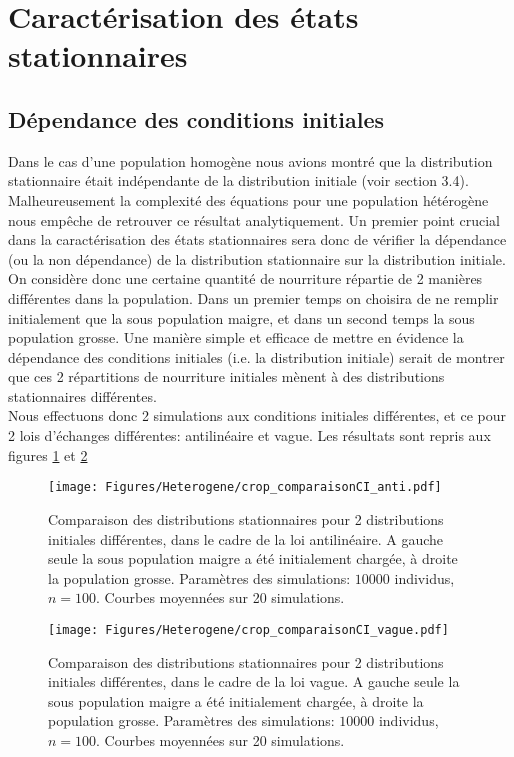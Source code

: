 \pagebreak

\section{Caractérisation des états stationnaires}

\subsection{Dépendance des conditions initiales}
Dans le cas d'une population homogène nous avions montré que la distribution stationnaire était indépendante de la distribution initiale (voir section 3.4). Malheureusement la complexité des équations pour une population hétérogène nous empêche de retrouver ce résultat analytiquement. Un premier point crucial dans la caractérisation des états stationnaires sera donc de vérifier la dépendance (ou la non dépendance) de la distribution stationnaire sur la distribution initiale.\\

On considère donc une certaine quantité de nourriture répartie de 2 manières différentes dans la population. Dans un premier temps on choisira de ne remplir initialement que la sous population maigre, et dans un second temps la sous population grosse. Une manière simple et efficace de mettre en évidence la dépendance des conditions initiales (i.e. la distribution initiale) serait de montrer que ces 2 répartitions de nourriture initiales mènent à des distributions stationnaires différentes. \\

Nous effectuons donc 2 simulations aux conditions initiales différentes, et ce pour 2 lois d'échanges différentes: antilinéaire et vague. Les résultats sont repris aux figures \ref{comparaison_CI_anti} et \ref{comparaison_CI_vague}\\

\begin{figure}[h!]
\centering
\texttt{[image: Figures/Heterogene/crop\_comparaisonCI\_anti.pdf]}
\caption{Comparaison des distributions stationnaires pour 2 distributions initiales différentes, dans le cadre de la loi antilinéaire. A gauche seule la sous population maigre a été initialement chargée, à droite la population grosse. Paramètres des simulations: $10000$ individus, $n=100$. Courbes moyennées sur 20 simulations.}
\label{comparaison_CI_anti}
\end{figure}

\begin{figure}[h!]
\centering
\texttt{[image: Figures/Heterogene/crop\_comparaisonCI\_vague.pdf]}
\caption{Comparaison des distributions stationnaires pour 2 distributions initiales différentes, dans le cadre de la loi vague. A gauche seule la sous population maigre a été initialement chargée, à droite la population grosse. Paramètres des simulations: $10000$ individus, $n=100$. Courbes moyennées sur 20 simulations.}
\label{comparaison_CI_vague}
\end{figure}

